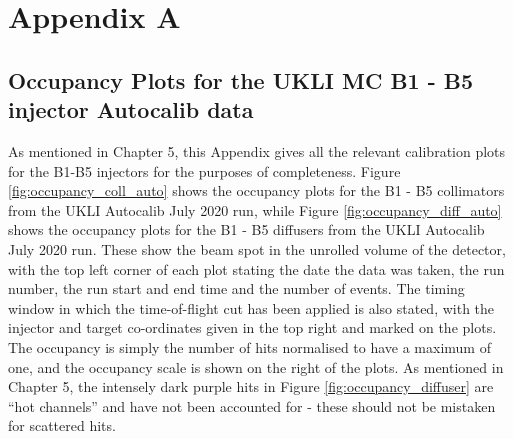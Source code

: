 \chapter{Appendix A}
\section{Occupancy Plots for the UKLI MC B1 - B5 injector Autocalib data}

As mentioned in Chapter 5, this Appendix gives all the relevant calibration plots for the B1-B5 injectors for the purposes of completeness. Figure \ref{fig:occupancy_coll_auto} shows the occupancy plots for the B1 - B5 collimators from the UKLI Autocalib July 2020 run, while  Figure \ref{fig:occupancy_diff_auto} shows the occupancy plots for the B1 - B5 diffusers from the UKLI Autocalib July 2020 run. These show the beam spot in the unrolled volume of the detector, with the top left corner of each plot stating the date the data was taken, the run number, the run start and end time and the number of events. The timing window in which the time-of-flight cut has been applied is also stated, with the injector and target co-ordinates given in the top right and marked on the plots. The occupancy is simply the number of hits normalised to have a maximum of one, and the occupancy scale is shown on the right of the plots. As mentioned in Chapter 5, the intensely dark purple hits in Figure \ref{fig:occupancy_diffuser} are ``hot channels'' and have not been accounted for - these should not be mistaken for scattered hits.

